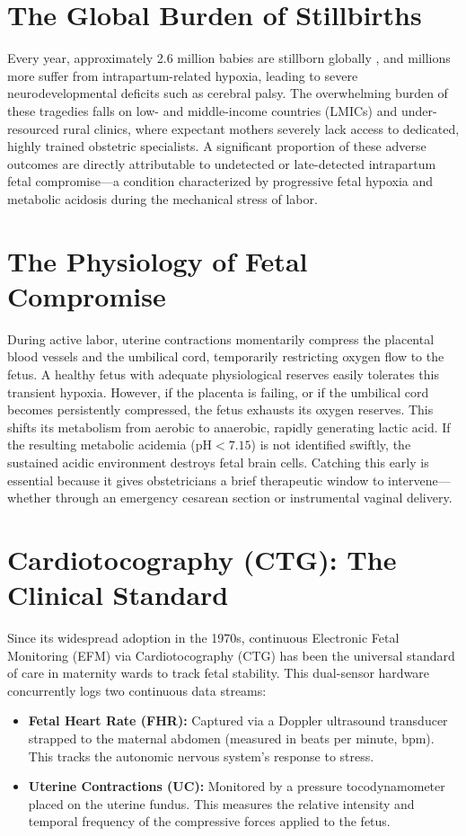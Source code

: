 \documentclass[12pt,a4paper]{report}
\begin{document}
\section{The Global Burden of Stillbirths}
Every year, approximately 2.6 million babies are stillborn globally \cite{who}, and millions more suffer from intrapartum-related hypoxia, leading to severe neurodevelopmental deficits such as cerebral palsy. The overwhelming burden of these tragedies falls on low- and middle-income countries (LMICs) and under-resourced rural clinics, where expectant mothers severely lack access to dedicated, highly trained obstetric specialists. A significant proportion of these adverse outcomes are directly attributable to undetected or late-detected intrapartum fetal compromise---a condition characterized by progressive fetal hypoxia and metabolic acidosis during the mechanical stress of labor.

\section{The Physiology of Fetal Compromise}
During active labor, uterine contractions momentarily compress the placental blood vessels and the umbilical cord, temporarily restricting oxygen flow to the fetus. A healthy fetus with adequate physiological reserves easily tolerates this transient hypoxia. However, if the placenta is failing, or if the umbilical cord becomes persistently compressed, the fetus exhausts its oxygen reserves. This shifts its metabolism from aerobic to anaerobic, rapidly generating lactic acid. If the resulting metabolic acidemia ($\text{pH} < 7.15$) is not identified swiftly, the sustained acidic environment destroys fetal brain cells. Catching this early is essential because it gives obstetricians a brief therapeutic window to intervene---whether through an emergency cesarean section or instrumental vaginal delivery.

\section{Cardiotocography (CTG): The Clinical Standard}
Since its widespread adoption in the 1970s, continuous Electronic Fetal Monitoring (EFM) via Cardiotocography (CTG) has been the universal standard of care in maternity wards to track fetal stability. This dual-sensor hardware concurrently logs two continuous data streams:
\begin{itemize}
    \item \textbf{Fetal Heart Rate (FHR):} Captured via a Doppler ultrasound transducer strapped to the maternal abdomen (measured in beats per minute, bpm). This tracks the autonomic nervous system's response to stress.
    \item \textbf{Uterine Contractions (UC):} Monitored by a pressure tocodynamometer placed on the uterine fundus. This measures the relative intensity and temporal frequency of the compressive forces applied to the fetus.
\end{itemize}
\end{document}
